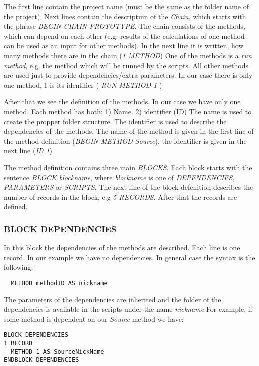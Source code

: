 \documentclass[12pt]{article}
\begin{document}
The first line contain the project name (must be the same as the folder name of the project).
Next lines contain the descriptuin of the \emph{Chain}, which starts with the phrase \emph{BEGIN CHAIN PROTOTYPE}.
The chain consists of the methods, which can depend on each other (e.g. results of the calculations of one method can be used as an input for other methods).
In the next line it is written, how many methods there are in the chain (\emph{1 METHOD})
One of the methods is a \emph{run method}, e.g. the method which will be runned by the scripts.
All other methods are used just to provide dependencies/extra parameters.
In our case there is only one method, 1 is its identifier ( \emph{RUN METHOD 1} )

After that we see the definition of the methods.
In our case we have only one method.
Each method has both: 1) Name. 2) identifier (ID)
The name is used to create the propper folder structure.
The identifier is used to describe the dependencies of the methods.
The name of the method is given in the first line of the method definition 
(\emph{BEGIN METHOD Source}), the identifier is given in the next line (\emph{ID 1})

The method definition contains three main \emph{BLOCKS}.
Each block starts with the sentence \emph{BLOCK blockname}, 
where \emph{blockname} is one of \emph{DEPENDENCIES}, \emph{PARAMETERS} or \emph{SCRIPTS}.
The next line of the block defenition describes the number of records in the block, e.g \emph{5 RECORDS}.
After that the records are defined.

\subsubsection{BLOCK DEPENDENCIES}
 
In this block the dependencies of the methods are described.
Each line is one record.
In our example we have no dependencies.
In general case the syntax is the following:
\begin{verbatim}
  METHOD methodID AS nickname
\end{verbatim}
The parameters of the dependencies are inherited and the folder of the dependencies is available in the scripts under the name \emph{nickname}
For example, if some method is dependent on our \emph{Source} method we have:
\begin{verbatim}
BLOCK DEPENDENCIES
1 RECORD
  METHOD 1 AS SourceNickName
ENDBLOCK DEPENDENCIES  
\end{verbatim}
\end{document}

